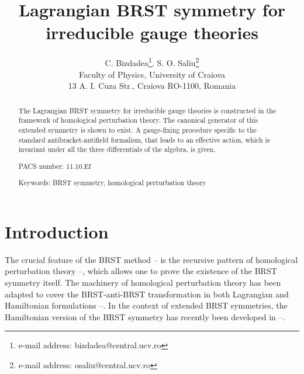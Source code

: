 \documentclass[a4paper,12pt]{article}
\begin{document}
\author{C. Bizdadea\thanks{%
e-mail address: bizdadea@central.ucv.ro}, S. O. Saliu\thanks{%
e-mail address: osaliu@central.ucv.ro} \\
Faculty of Physics, University of Craiova\\
13 A. I. Cuza Str., Craiova RO-1100, Romania}
\title{Lagrangian \coordHE{} BRST symmetry for irreducible gauge theories}
\maketitle

\begin{abstract}
The Lagrangian \coordHE{} BRST symmetry for irreducible gauge theories is
constructed in the framework of homological perturbation theory. The
canonical generator of this extended symmetry is shown to exist. A
gauge-fixing procedure specific to the standard antibracket-antifield
formalism, that leads to an effective action, which is invariant under all
the three differentials of the \coordHE{} algebra, is given.

PACS number: 11.10.Ef

Keywords: BRST symmetry, homological perturbation theory
\end{abstract}

\section{Introduction}

The crucial feature of the BRST method \cite{1}--\cite{12} is the recursive
pattern of homological perturbation theory \cite{13}--\cite{19}, which
allows one to prove the existence of the BRST symmetry itself. The machinery
of homological perturbation theory has been adapted to cover the
BRST-anti-BRST transformation in both Lagrangian and Hamiltonian
formulations \cite{20}--\cite{37}. In the context of extended BRST
symmetries, the Hamiltonian version of the \coordHE{} BRST symmetry has
recently been developed in \cite{38}--\cite{40}.
\end{document}

